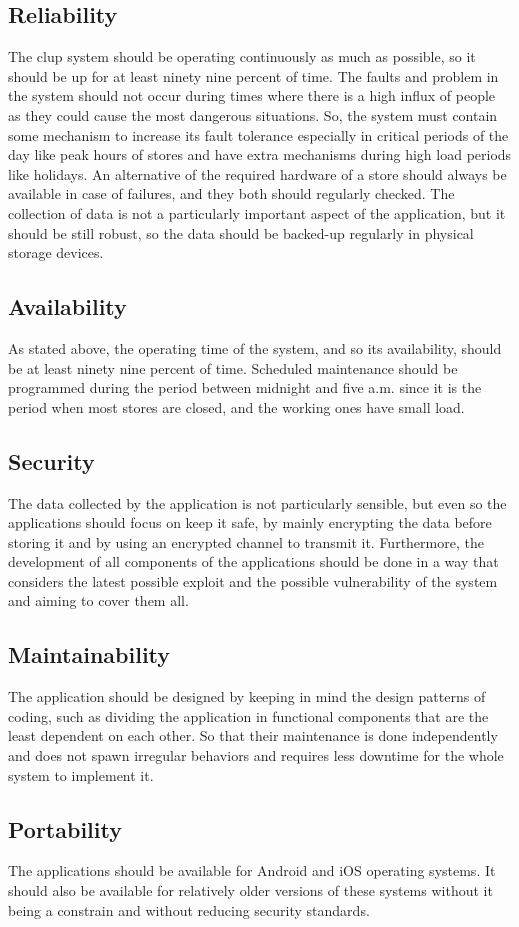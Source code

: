 \subsection{Reliability}
The \gls{clup} system should be operating continuously as much as possible, so it should be up for at least ninety nine percent of time. The faults and problem in the system should not occur during times where there is a high influx of people as they could cause the most dangerous situations. So, the system must contain some mechanism to increase its fault tolerance especially in critical periods of the day like peak hours of stores and have extra mechanisms during high load periods like holidays. An alternative of the required hardware of a store should always be available in case of failures, and they both should regularly checked. The collection of data is not a particularly important aspect of the application, but it should be still robust, so the data should be backed-up regularly in physical storage devices. 

\subsection{Availability}
As stated above, the operating time of the system, and so its availability, should be at least ninety nine percent of time. Scheduled maintenance should be programmed during the period between midnight and five a.m. since it is the period when most stores are closed, and the working ones have small load.

\subsection{Security}
The data collected by the application is not particularly sensible, but even so the applications should focus on keep it safe, by mainly encrypting the data before storing it and by using an encrypted channel to transmit it. Furthermore, the development of all components of the applications should be done in a way that considers the latest possible exploit and the possible vulnerability of the system and aiming to cover them all.  

\subsection{Maintainability}
The application should be designed by keeping in mind the design patterns of coding, such as dividing the application in functional components that are the least dependent on each other. So that their maintenance is done independently and does not spawn irregular behaviors and requires less downtime for the whole system to implement it. 

\subsection{Portability}
The applications should be available for Android and iOS operating systems. It should also be available for relatively older versions of these systems without it being a constrain and without reducing security standards.
